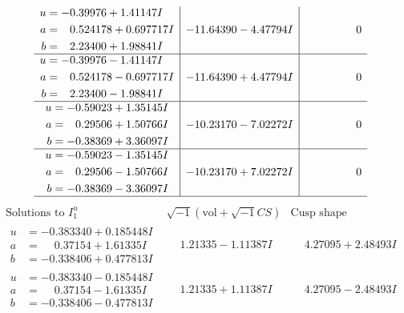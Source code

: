 \documentclass[1p]{elsarticle_modified}
\theoremstyle{definition}
\newcommand{\I}{\sqrt{-1}}
\begin{document}
$$\begin{array}{c|c|c}
\begin{aligned}
u &= -0.39976 + 1.41147 I \\
a &= \phantom{-}0.524178 + 0.697717 I \\
b &= \phantom{-}2.23400 + 1.98841 I\end{aligned}
 & -11.64390 - 4.47794 I & \phantom{-0.000000 } 0 \\ \hline\begin{aligned}
u &= -0.39976 - 1.41147 I \\
a &= \phantom{-}0.524178 - 0.697717 I \\
b &= \phantom{-}2.23400 - 1.98841 I\end{aligned}
 & -11.64390 + 4.47794 I & \phantom{-0.000000 } 0 \\ \hline\begin{aligned}
u &= -0.59023 + 1.35145 I \\
a &= \phantom{-}0.29506 + 1.50766 I \\
b &= -0.38369 + 3.36097 I\end{aligned}
 & -10.23170 - 7.02272 I & \phantom{-0.000000 } 0 \\ \hline\begin{aligned}
u &= -0.59023 - 1.35145 I \\
a &= \phantom{-}0.29506 - 1.50766 I \\
b &= -0.38369 - 3.36097 I\end{aligned}
 & -10.23170 + 7.02272 I & \phantom{-0.000000 } 0\\
 \hline 
 \end{array}$$\newpage$$\begin{array}{c|c|c}  
\text{Solutions to }I^u_{1}& \I (\text{vol} + \sqrt{-1}CS) & \text{Cusp shape}\\
 \hline 
\begin{aligned}
u &= -0.383340 + 0.185448 I \\
a &= \phantom{-}0.37154 + 1.61335 I \\
b &= -0.338406 + 0.477813 I\end{aligned}
 & \phantom{-}1.21335 - 1.11387 I & \phantom{-}4.27095 + 2.48493 I \\ \hline\begin{aligned}
u &= -0.383340 - 0.185448 I \\
a &= \phantom{-}0.37154 - 1.61335 I \\
b &= -0.338406 - 0.477813 I\end{aligned}
 & \phantom{-}1.21335 + 1.11387 I & \phantom{-}4.27095 - 2.48493 I \\ \hline\begin{aligned}

\end{aligned}
\end{array}$$
\end{document}
